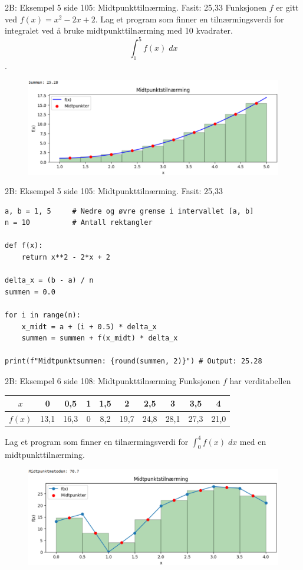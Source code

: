 \greenheader
\begin{frame}{2B: Eksempel 5 side 105: Midtpunkttilnærming. Fasit: 25,33}
Funksjonen $f$ er gitt ved $f(x)=x^2-2x+2$. Lag et program som finner en tilnærmingsverdi for integralet ved å bruke midtpunkttilnærming med 10 kvadrater.
\[
\int_1^5f(x)\;dx
\].
\begin{figure}
    \centering
    \includegraphics[width=0.9\linewidth]{R2-K2B-7.png}
\end{figure}
\end{frame}


\greenheader
\begin{frame}[fragile]{2B: Eksempel 5 side 105: Midtpunkttilnærming. Fasit: 25,33}
\begin{verbatim}
a, b = 1, 5     # Nedre og øvre grense i intervallet [a, b]
n = 10          # Antall rektangler

def f(x):
    return x**2 - 2*x + 2

delta_x = (b - a) / n
summen = 0.0

for i in range(n):
    x_midt = a + (i + 0.5) * delta_x
    summen = summen + f(x_midt) * delta_x

print(f"Midtpunktsummen: {round(summen, 2)}") # Output: 25.28
\end{verbatim}
\end{frame}

\greenheader
\begin{frame}{2B: Eksempel 6 side 108: Midtpunkttilnærming}
Funksjonen $f$ har verditabellen
\begin{table}[h]
\centering
\begin{tabular}{c|ccccccccc}
$x$ & 0 & 0,5 & 1 & 1,5 & 2 & 2,5 & 3 & 3,5 & 4 \\
\hline
$f(x)$ & 13,1 & 16,3 & 0 & 8,2 & 19,7 & 24,8 & 28,1 & 27,3 & 21,0 \\
\end{tabular}
\end{table}
Lag et program som finner en tilnærmingsverdi for $\int_0^4 f(x)\;dx$ med en midtpunkttilnærming.
\begin{figure}
    \centering
    \includegraphics[width=0.8\linewidth]{R2-K2B-6.png}

\end{figure}
\end{frame}

